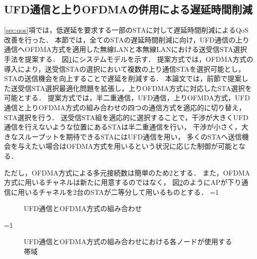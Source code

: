 \documentclass[master]{kuisthesis}		%
\newcounter{flagFig}
\begin{document}
		\subsection{UFD通信と上りOFDMAの併用による遅延時間削減}\label{sec:ufd_ofdma}
			\ref{sec:qos}項では，低遅延を要求する一部のSTAに対して遅延時間削減によるQoS改善を行った．
			本節では，全てのSTAの遅延時間削減に向け，UFD通信の上り通信へOFDMA方式を適用した無線LANと本無線LANにおける送受信STA選択手法を提案する．
			図\ref{fig:ofdma}にシステムモデルを示す．
			提案方式では，OFDMA方式の導入により，送受信STAの選択において複数の上り通信STAを選択可能とし，
			STAの送信機会を向上することで遅延を削減する．
			本論文では，前節で提案した送受信STA選択最適化問題を拡張し，上りOFDMA方式に対応したSTA選択を可能とする．
			提案方式では，半二重通信，UFD通信，上りOFMDA方式，UFD通信と上りOFDMA方式の組み合わせの四つの通信方式を適応的に切り替え，STA選択を行う．
			送受信STA組を適応的に選択することで，干渉が大きくUFD通信を行えないような位置にあるSTAは半二重通信を行い，
			干渉が小さく，大きなスループットを期待できるSTAにはUFD通信を用い，
			多くのSTAへ送信機会を与えたい場合はOFDMA方式を用いるという状況に応じた制御が可能となる．
			\par
			ただし，OFDMA方式による多元接続数は簡単のため2とする．
			また，OFDMA方式に用いるチャネルは新たに用意するのではなく，
			図\ref{fig:ufd_ofdma_channel}のようにAPが下り通信に用いるチャネルを2台のSTAが二等分して用いるものとする．
			\ifnum\value{flagFig}=1 {\begin{figure}[htbp]
				\centering
				\caption{UFD通信とOFDMA方式の組み合わせ}
				\label{fig:ofdma}
			\end{figure}}\fi
			\ifnum\value{flagFig}=1 {\begin{figure}[htbp]
				\centering
				\caption{UFD通信とOFDMA方式の組み合わせにおける各ノードが使用する帯域}
				\label{fig:ufd_ofdma_channel}
			\end{figure}}\fi
\end{document}

